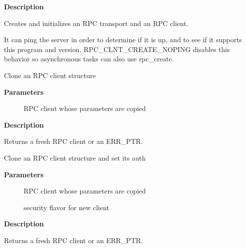\documentclass[a4paper,8pt,english]{sphinxmanual}
\begin{document}
\textbf{Description}

Creates and initializes an RPC transport and an RPC client.

It can ping the server in order to determine if it is up, and to see if
it supports this program and version.  RPC\_CLNT\_CREATE\_NOPING disables
this behavior so asynchronous tasks can also use rpc\_create.

\begin{fulllineitems}
\label{networking/kapi:c.rpc_clone_client}
Clone an RPC client structure

\end{fulllineitems}


\textbf{Parameters}
\begin{description}
\item[{}] \leavevmode
RPC client whose parameters are copied

\end{description}

\textbf{Description}

Returns a fresh RPC client or an ERR\_PTR.

\begin{fulllineitems}
\label{networking/kapi:c.rpc_clone_client_set_auth}
Clone an RPC client structure and set its auth

\end{fulllineitems}


\textbf{Parameters}
\begin{description}
\item[{}] \leavevmode
RPC client whose parameters are copied

\item[{}] \leavevmode
security flavor for new client

\end{description}

\textbf{Description}

Returns a fresh RPC client or an ERR\_PTR.

\begin{fulllineitems}
\label{networking/kapi:c.rpc_switch_client_transport}
\end{fulllineitems}
\end{document}
